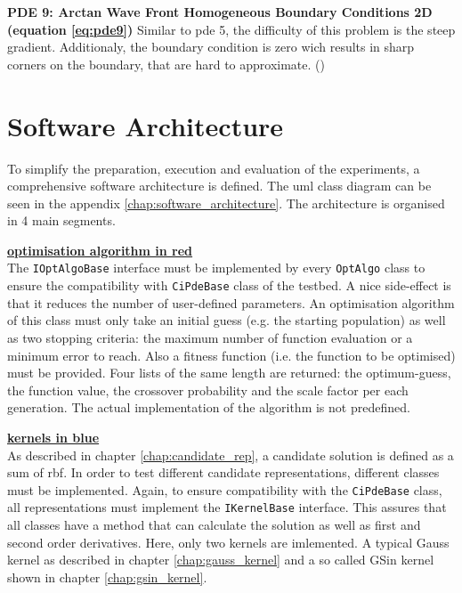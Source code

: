 \documentclass[./\jobname.tex]{subfiles}
\begin{document}
\textbf{PDE 9: Arctan Wave Front Homogeneous Boundary Conditions 2D (equation \ref{eq:pde9})} Similar to \gls{pde} 5, the difficulty of this problem is the steep gradient. Additionaly, the boundary condition is zero wich results in sharp corners on the boundary, that are hard to approximate. (\cite{mitchell_nist_2018})


\section{Software Architecture}
\label{chap:software_architecutre}



\newcommand{\inlinecode}[1]{\colorbox{light-gray}{\lstinline[basicstyle=\ttfamily\color{black}]|#1|}}

To simplify the preparation, execution and evaluation of the experiments, a comprehensive software architecture is defined. The \gls{uml} class diagram can be seen in the appendix \ref{chap:software_architecture}. The architecture is organised in 4 main segments. 

\textcolor{opt_algo_colour}{\large \underline{\textbf{optimisation algorithm in red}}} \\
The \inlinecode{IOptAlgoBase} interface must be implemented by every \inlinecode{OptAlgo} class to ensure the compatibility with \inlinecode{CiPdeBase} class of the testbed. A nice side-effect is that it reduces the number of user-defined parameters. An optimisation algorithm of this class must only take an initial guess (e.g. the starting population) as well as two stopping criteria: the maximum number of function evaluation or a minimum error to reach. Also a fitness function (i.e. the function to be optimised) must be provided. Four lists of the same length are returned: the optimum-guess, the function value, the crossover probability and the scale factor per each generation. The actual implementation of the algorithm is not predefined. 

\textcolor{kernels_colour}{\large \underline{\textbf{kernels in blue}}} \\
As described in chapter \ref{chap:candidate_rep}, a candidate solution is defined as a sum of \gls{rbf}. In order to test different candidate representations, different classes must be implemented. Again, to ensure compatibility with the \inlinecode{CiPdeBase} class, all representations must implement the \inlinecode{IKernelBase} interface. This assures that all classes have a method that can calculate the solution as well as first and second order derivatives. Here, only two kernels are imlemented. A typical Gauss kernel as described in chapter \ref{chap:gauss_kernel} and a so called GSin kernel shown in chapter \ref{chap:gsin_kernel}. 
\end{document}
